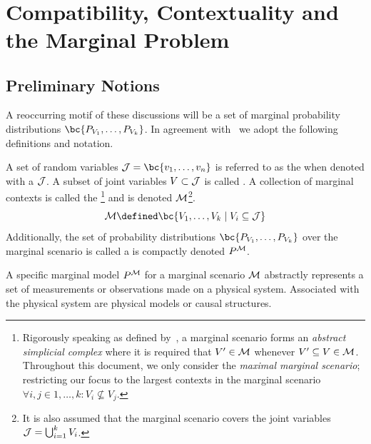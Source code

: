 \documentclass[aps, 10pt, english, twoside, pra, nofootinbib, longbibliography]{revtex4-1}
\begin{document}
     \\


    \section{Compatibility, Contextuality and the Marginal Problem}
    \label{sec:comp_con_mp}

    \subsection{Preliminary Notions}
    \label{eq:comp_con_mp_notions}
    A reoccurring motif of these discussions will be a set of marginal probability distributions $\bc{\prob[V_1], \ldots, \prob[V_k]}$. In agreement with~\cite{Fritz_2011} we adopt the following definitions and notation.

    \begin{definition}
        \label{def:marginal_model}
        A set of random variables $\jointvar = \bc{v_1, \ldots, v_n}$ is referred to as the  when denoted with a $\mathcal{J}$. A subset of joint variables $V \subset \mathcal{J}$ is called . A collection of marginal contexts is called the \footnote{Rigorously speaking as defined by~\cite{Fritz_2011}, a marginal scenario forms an \textit{abstract simplicial complex} where it is required that $V' \in \mathcal{M}$ whenever $V' \subseteq V \in \mathcal{M}$. Throughout this document, we only consider the \textit{maximal marginal scenario}; restricting our focus to the largest contexts in the marginal scenario $\forall i,j \in 1, \ldots, k: V_i \not \subseteq V_j$.} and is denoted $\mathcal{M}$\footnote{It is also assumed that the marginal scenario covers the joint variables $\mathcal{J} = \bigcup_{i = 1}^{k} V_i$.}.
        \[ \mscenario \defined \bc{V_1, \ldots, V_k \mid V_i \subseteq \jointvar} \]
        Additionally, the set of probability distributions $\bc{\prob[V_1], \ldots, \prob[V_k]}$ over the marginal scenario is called a  is compactly denoted $\prob^{\mscenario}$.
    \end{definition}
    A specific marginal model $\prob^{\mscenario}$ for a marginal scenario $\mathcal{M}$ abstractly represents a set of measurements or observations made on a physical system. Associated with the physical system are physical models or causal structures.
\end{document}
